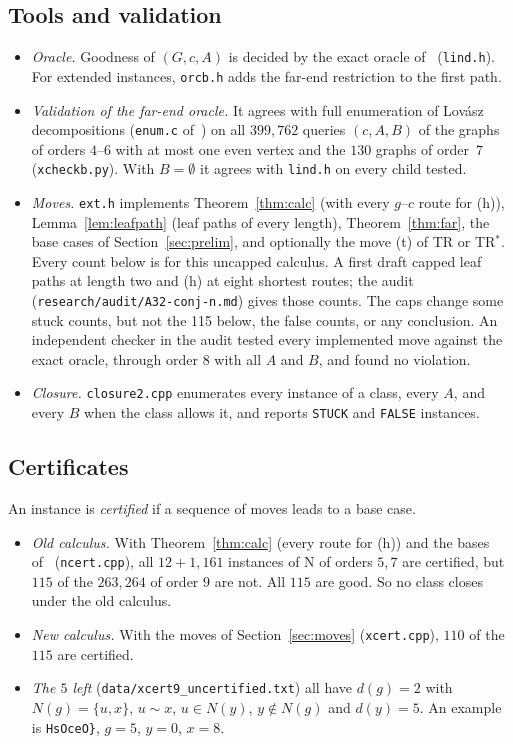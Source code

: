 \documentclass[11pt]{amsart}
\theoremstyle{definition}
\begin{document}
\subsection*{Tools and validation}
\begin{itemize}
\item \emph{Oracle.} Goodness of $(G,c,A)$ is decided by the exact oracle of~\cite{L1I}
(\texttt{lind.h}). For extended instances, \texttt{orcb.h} adds the far-end restriction to the
first path.
\item \emph{Validation of the far-end oracle.} It agrees with full enumeration of Lov\'asz
decompositions (\texttt{enum.c} of~\cite{DL}) on all $399{,}762$ queries $(c,A,B)$ of the graphs of
orders $4$--$6$ with at most one even vertex and the $130$ graphs of order~$7$
(\texttt{xcheckb.py}). With $B=\emptyset$ it agrees with \texttt{lind.h} on every child tested.
\item \emph{Moves.} \texttt{ext.h} implements Theorem~\ref{thm:calc} (with every $g$--$c$ route
for (h)), Lemma~\ref{lem:leafpath} (leaf paths of every length), Theorem~\ref{thm:far}, the base
cases of Section~\ref{sec:prelim}, and optionally the move (t) of TR or TR$^*$. Every count below
is for this uncapped calculus. A first draft capped leaf paths at length two and (h) at eight
shortest routes; the audit (\texttt{research/audit/A32-conj-n.md}) gives those counts. The caps
change some stuck counts, but not the 115 below, the false counts, or any conclusion. An
independent checker in the audit tested every implemented move against the exact oracle, through
order $8$ with all $A$ and $B$, and found no violation.
\item \emph{Closure.} \texttt{closure2.cpp} enumerates every instance of a class, every $A$, and
every $B$ when the class allows it, and reports \texttt{STUCK} and \texttt{FALSE} instances.
\end{itemize}

\subsection{Certificates}
An instance is \emph{certified} if a sequence of moves leads to a base case.
\begin{itemize}
\item \emph{Old calculus.} With Theorem~\ref{thm:calc} (every route for (h)) and the bases
of~\cite{L1I,DL} (\texttt{ncert.cpp}), all $12+1{,}161$ instances of N of orders $5,7$ are certified,
but $115$ of the $263{,}264$ of order $9$ are not. All $115$ are good. So no class closes under the old calculus.
\item \emph{New calculus.} With the moves of Section~\ref{sec:moves} (\texttt{xcert.cpp}), $110$ of
the $115$ are certified.
\item \emph{The $5$ left} (\texttt{data/xcert9\_uncertified.txt}) all have $d(g)=2$ with
$N(g)=\{u,x\}$, $u\sim x$, $u\in N(y)$, $y\notin N(g)$ and $d(y)=5$. An example is
\texttt{HsOceO\}}, $g=5$, $y=0$, $x=8$.
\end{itemize}
\end{document}
